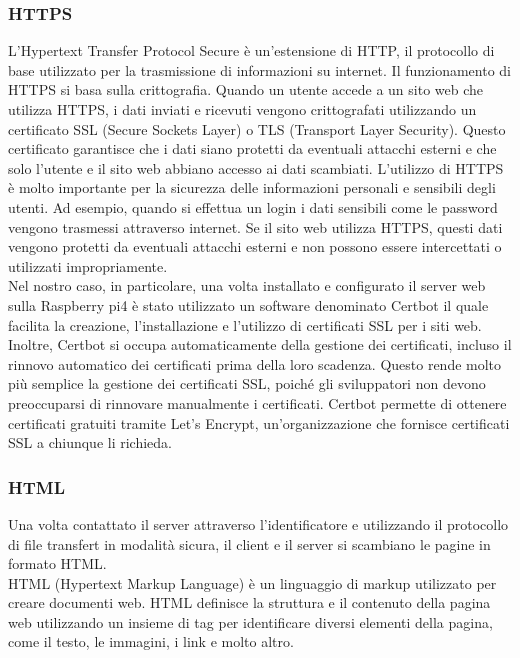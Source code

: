 \documentclass[a4paper,final,12pt]{report}
\begin{document}
\subsubsection{HTTPS}
L'Hypertext Transfer Protocol Secure è un'estensione di HTTP, il protocollo di base utilizzato per la trasmissione di informazioni su internet. Il funzionamento di HTTPS si basa sulla crittografia. Quando un utente accede a un sito web che utilizza HTTPS, i dati inviati e ricevuti vengono crittografati utilizzando un certificato SSL (Secure Sockets Layer) o TLS (Transport Layer Security). Questo certificato garantisce che i dati siano protetti da eventuali attacchi esterni e che solo l'utente e il sito web abbiano accesso ai dati scambiati.
L'utilizzo di HTTPS è molto importante per la sicurezza delle informazioni personali e sensibili degli utenti. Ad esempio, quando si effettua un login i dati sensibili come le password vengono trasmessi attraverso internet. Se il sito web utilizza HTTPS, questi dati vengono protetti da eventuali attacchi esterni e non possono essere intercettati o utilizzati impropriamente.\\
Nel nostro caso, in particolare, una volta installato e configurato il server web sulla Raspberry pi4 è stato utilizzato un software denominato Certbot il quale facilita la creazione, l'installazione e l'utilizzo di certificati SSL per i siti web. Inoltre, Certbot si occupa automaticamente della gestione dei certificati, incluso il rinnovo automatico dei certificati prima della loro scadenza. Questo rende molto più semplice la gestione dei certificati SSL, poiché gli sviluppatori non devono preoccuparsi di rinnovare manualmente i certificati.
Certbot permette di ottenere certificati gratuiti tramite Let's Encrypt, un'organizzazione che fornisce certificati SSL a chiunque li richieda.\\

\subsubsection{HTML}
Una volta contattato il server attraverso l'identificatore e utilizzando il protocollo di file transfert in modalità sicura, il client e il server si scambiano le pagine in formato HTML.\\
HTML (Hypertext Markup Language) è un linguaggio di markup utilizzato per creare documenti web. HTML definisce la struttura e il contenuto della pagina web utilizzando un insieme di tag per identificare diversi elementi della pagina, come il testo, le immagini, i link e molto altro.
\end{document}
